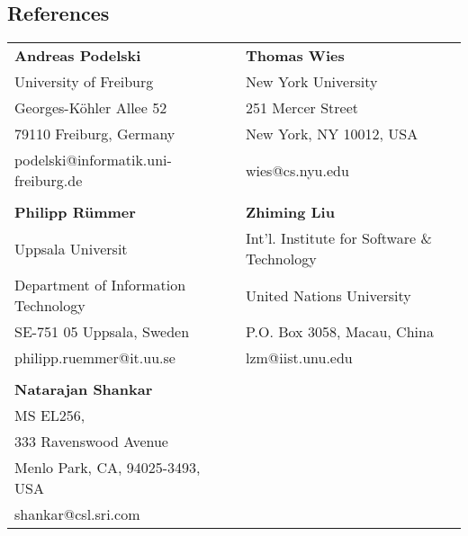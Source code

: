 \documentclass[margin,line]{res}
\begin{document}
\begin{resume}
\section{\sc References}
\begin{tabular}{@{}p{2.5in}p{2.5in}}
  {\bf Andreas Podelski} & {\bf Thomas Wies}\\
  University of Freiburg & New York University\\
  Georges-K\"ohler Allee 52 & 251 Mercer Street\\
  79110 Freiburg, Germany & New York, NY 10012, USA\\
  podelski@informatik.uni-freiburg.de & wies@cs.nyu.edu\\
  \\
  {\bf Philipp R\"ummer}  & {\bf Zhiming Liu}\\
  Uppsala Universit  & Int'l. Institute for Software \& Technology\\
  Department of Information Technology & United Nations University \\
  SE-751 05 Uppsala, Sweden  & P.O. Box 3058, Macau, China\\
  philipp.ruemmer@it.uu.se   & lzm@iist.unu.edu \\
  \\
  {\bf Natarajan Shankar} \\
  MS EL256, \\
  333 Ravenswood Avenue \\
  Menlo Park, CA, 94025-3493, USA \\ 
  shankar@csl.sri.com
\end{tabular}
\fi

\end{resume}
\end{document}
